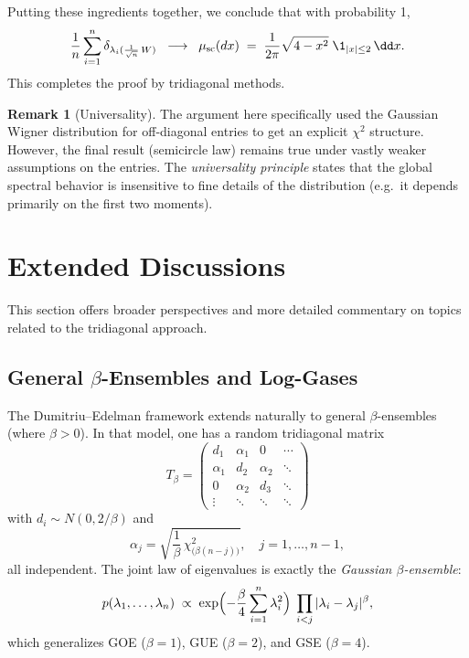 \documentclass[letterpaper,11pt,oneside,reqno]{article}
\numberwithin{equation}{section}
\theoremstyle{definition}
\newtheorem{remark}[proposition]{Remark}
\begin{document}
Putting these ingredients together, we conclude that with probability 1,
\[
  \frac{1}{n}\sum_{i=1}^n \delta_{\lambda_i(\frac1{\sqrt{n}}\,W)}
  \;\;\longrightarrow\;\;
  \mu_{\mathrm{sc}}(dx) \;=\; \frac{1}{2\pi}\sqrt{4-x^2}\;\1_{|x|\le2}\,\dd x.
\]
This completes the proof by tridiagonal methods.

\begin{remark}[Universality]
The argument here specifically used the Gaussian Wigner distribution for off-diagonal entries to get an explicit $\chi^2$ structure. However, the final result (semicircle law) remains true under vastly weaker assumptions on the entries. The \emph{universality principle} states that the global spectral behavior is insensitive to fine details of the distribution (e.g.\ it depends primarily on the first two moments).
\end{remark}

\section{Extended Discussions}
\label{sec:extended-discussion}

This section offers broader perspectives and more detailed commentary on topics related to the tridiagonal approach.

\subsection{General \texorpdfstring{$\beta$}{beta}-Ensembles and Log-Gases}

The Dumitriu--Edelman framework extends naturally to general $\beta$-ensembles (where $\beta>0$). In that model, one has a random tridiagonal matrix
\[
  T_\beta
  =
  \begin{pmatrix}
   d_1 & \alpha_1 & 0 & \cdots \\
   \alpha_1 & d_2 & \alpha_2 & \ddots \\
   0 & \alpha_2 & d_3 & \ddots \\
   \vdots & \ddots & \ddots & \ddots
  \end{pmatrix}
\]
with $d_i \sim N(0,2/\beta)$ and
\[
  \alpha_j
  = \sqrt{\frac{1}{\beta}\,\chi^2_{\bigl(\beta(n-j)\bigr)}},
  \quad j=1,\ldots,n-1,
\]
all independent. The joint law of eigenvalues is exactly the \emph{Gaussian $\beta$-ensemble}:
\[
  p(\lambda_1,\dots,\lambda_n)
  \;\propto\;
  \exp\Bigl(-\frac{\beta}{4}\sum_{i=1}^n \lambda_i^2\Bigr)
  \;\prod_{i<j}|\lambda_i - \lambda_j|^\beta,
\]
which generalizes GOE ($\beta=1$), GUE ($\beta=2$), and GSE ($\beta=4$).
\end{document}
